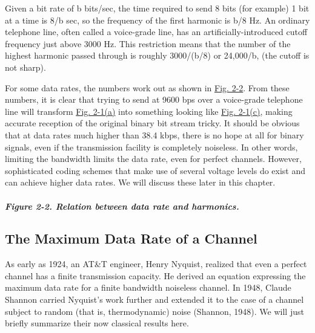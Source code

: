 Given a bit rate of {b} bits/sec, the time required to send 8 bits (for
example) 1 bit at a time is 8{/b} sec, so the frequency of the first
harmonic is {b/}8 Hz. An ordinary telephone line, often called a
{voice-grade line}, has an artificially-introduced cutoff frequency just
above 3000 Hz. This restriction means that the number of the highest
harmonic passed through is roughly 3000{/}({b/}8) or 24,000{/b}, (the
cutoff is not sharp).

For some data rates, the numbers work out as shown in
\protect\hyperlink{0130661023_ch02lev1sec1.htmlux5cux23ch02fig02}{Fig.
2-2}. From these numbers, it is clear that trying to send at 9600 bps
over a voice-grade telephone line will transform
\protect\hyperlink{0130661023_ch02lev1sec1.htmlux5cux23ch02fig01}{Fig.
2-1(a)} into something looking like
\protect\hyperlink{0130661023_ch02lev1sec1.htmlux5cux23ch02fig01}{Fig.
2-1(c)}, making accurate reception of the original binary bit stream
tricky. It should be obvious that at data rates much higher than 38.4
kbps, there is no hope at all for {binary} signals, even if the
transmission facility is completely noiseless. In other words, limiting
the bandwidth limits the data rate, even for perfect channels. However,
sophisticated coding schemes that make use of several voltage levels do
exist and can achieve higher data rates. We will discuss these later in
this chapter.

\subparagraph[Figure 2-2. Relation between data rate and
harmonics.]{\texorpdfstring{\protect\hypertarget{0130661023_ch02lev1sec1.htmlux5cux23ch02fig02}{}{}Figure
2-2. Relation between data rate and
harmonics.}{Figure 2-2. Relation between data rate and harmonics.}}


\protect\hypertarget{0130661023_ch02lev1sec1.htmlux5cux23ch02lev2sec3}{}{}

\subsection{The Maximum Data Rate of a Channel}

As early as 1924, an AT\&T engineer, Henry Nyquist, realized that even a
perfect channel has a finite transmission capacity. He derived an
equation expressing the maximum data rate for a finite bandwidth
noiseless channel. In 1948, Claude Shannon carried Nyquist's work
further and extended it to the case of a channel subject to random (that
is, thermodynamic) noise (Shannon, 1948). We will just briefly summarize
their now classical results here.


